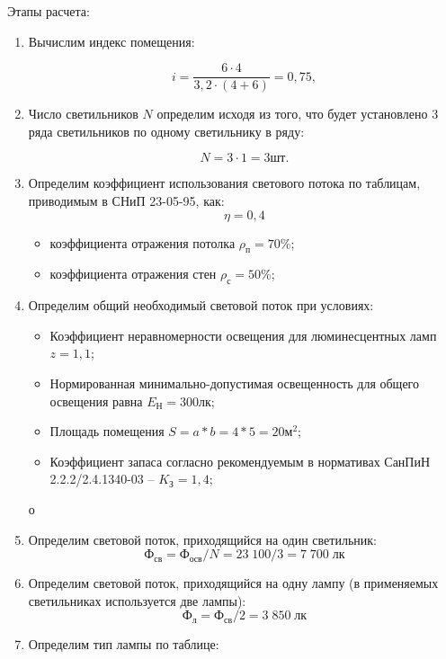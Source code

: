 Этапы расчета:
\begin{enumerate}
\item Вычислим индекс помещения:

$$
i=\frac{6 \cdot 4 }{3,2 \cdot (4 + 6)} = 0,75,
$$

\item Число светильников $N$ определим исходя из того, что будет установлено 3 ряда светильников по одному светильнику в ряду:

$$ N = 3 \cdot 1 = 3 шт.$$ 

\item Определим коэффициент использования светового потока по таблицам, приводимым в СНиП 23-05-95, как:
$$ \eta = 0,4 $$
	\begin{itemize}
		\item коэффициента отражения потолка $\rho_п = 70$\%;
		\item коэффициента отражения стен $\rho_с = 50$\%;
	\end{itemize}
	
\item Определим общий необходимый световой поток при условиях:
\begin{itemize}
		\item Коэффициент неравномерности освещения для люминесцентных ламп $z = 1,1$;
		\item Нормированная минимально-допустимая освещенность для общего освещения равна $E_Н = 300 лк$;
		\item Площадь помещения $S=a*b=4*5=20 м^2$;
		\item Коэффициент запаса согласно рекомендуемым в нормативах СанПиН 2.2.2/2.4.1340-03 – $K_З = 1,4$;
	\end{itemize}
	
	$о$
	\item Определим световой поток, приходящийся на один светильник:
	  $$ Ф_{св}= Ф_{осв}/N = {23 \; 100}/3 = 7 \; 700 \; лк $$
	 
	\item Определим световой поток, приходящийся на одну лампу (в применяемых светильниках используется две лампы):
	$$ Ф_л = Ф_{св}/2 = 3\;850 \; лк$$
	 \item Определим тип лампы по таблице:
	 

\end{enumerate}
